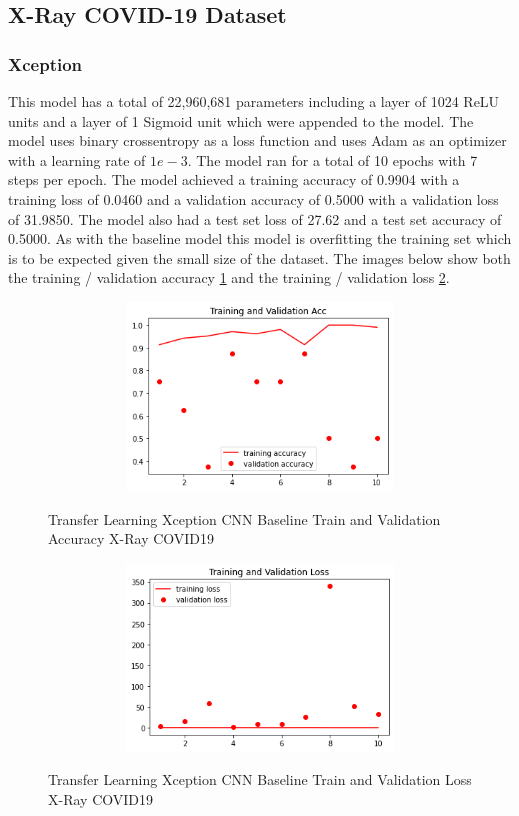 \subsection{X-Ray COVID-19 Dataset}
\subsubsection{Xception}
This model has a total of 22,960,681 parameters including a layer of 1024 ReLU units and a layer of 1 Sigmoid unit which were appended to the model. The model uses binary crossentropy as a loss function and uses Adam as an optimizer with a learning rate of $1e-3$. 
The model ran for a total of 10 epochs with 7 steps per epoch.  The model achieved a training accuracy of 0.9904  with a training loss of 0.0460 and a validation accuracy of 0.5000 with a validation loss of 31.9850.  The model also had a test set loss of 27.62 and a test set accuracy of 0.5000.  As with the baseline model this model is overfitting the training set which is to be expected given the small size of the dataset.  The images below show both the training / validation accuracy \ref{fig:Xception CNN Baseline Train and Validation Accuracy X-Ray COVID19} and the training / validation loss \ref{fig:Xception CNN Baseline Train and Validation Loss X-Ray COVID19}. 
 \begin{figure}[H]
    \centering
    \includegraphics[width=1\textwidth,height=5cm,keepaspectratio]{Images/XceptionBaselineTrainingValidationAccuracyXRayCOVID19.png}\\
    \caption{Transfer Learning Xception CNN Baseline Train and Validation Accuracy X-Ray COVID19}
    \label{fig:Xception CNN Baseline Train and Validation Accuracy X-Ray COVID19}
\end{figure}
 \begin{figure}[H]
    \centering
    \includegraphics[width=1\textwidth,height=5cm,keepaspectratio]{Images/XceptionBaselineTrainingValidationLossXRayCOVID19.png}\\
    \caption{Transfer Learning Xception CNN Baseline Train and Validation Loss X-Ray COVID19}
    \label{fig:Xception CNN Baseline Train and Validation Loss X-Ray COVID19}
\end{figure}
